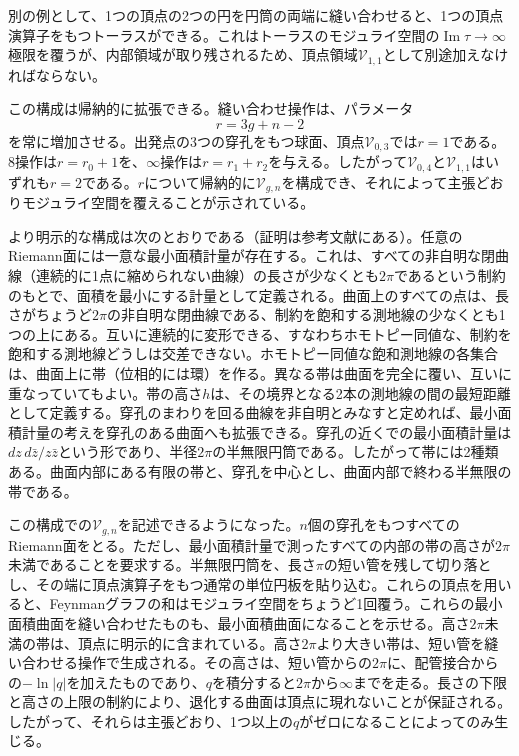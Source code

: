 別の例として、1つの頂点の2つの円を円筒の両端に縫い合わせると、1つの頂点演算子をもつトーラスができる。これはトーラスのモジュライ空間の$\operatorname{Im}\tau\to\infty$極限を覆うが、内部領域が取り残されるため、頂点領域$\mathcal V_{1,1}$として別途加えなければならない。

この構成は帰納的に拡張できる。縫い合わせ操作は、パラメータ
\begin{equation}
 r=3g+n-2
 \tag{9.3.8}\label{eq:9.3.8}
\end{equation}
を常に増加させる。出発点の3つの穿孔をもつ球面、頂点$\mathcal V_{0,3}$では$r=1$である。$8$操作は$r=r_0+1$を、$\infty$操作は$r=r_1+r_2$を与える。したがって$\mathcal V_{0,4}$と$\mathcal V_{1,1}$はいずれも$r=2$である。$r$について帰納的に$\mathcal V_{g,n}$を構成でき、それによって主張どおりモジュライ空間を覆えることが示されている。

より明示的な構成は次のとおりである（証明は参考文献にある）。任意のRiemann面には一意な最小面積計量が存在する。これは、すべての非自明な閉曲線（連続的に1点に縮められない曲線）の長さが少なくとも$2\pi$であるという制約のもとで、面積を最小にする計量として定義される。曲面上のすべての点は、長さがちょうど$2\pi$の非自明な閉曲線である、制約を飽和する測地線の少なくとも1つの上にある。互いに連続的に変形できる、すなわちホモトピー同値な、制約を飽和する測地線どうしは交差できない。ホモトピー同値な飽和測地線の各集合は、曲面上に帯（位相的には環）を作る。異なる帯は曲面を完全に覆い、互いに重なっていてもよい。帯の高さ$h$は、その境界となる2本の測地線の間の最短距離として定義する。穿孔のまわりを回る曲線を非自明とみなすと定めれば、最小面積計量の考えを穿孔のある曲面へも拡張できる。穿孔の近くでの最小面積計量は$dz\,d\bar z/z\bar z$という形であり、半径$2\pi$の半無限円筒である。したがって帯には2種類ある。曲面内部にある有限の帯と、穿孔を中心とし、曲面内部で終わる半無限の帯である。

この構成での$\mathcal V_{g,n}$を記述できるようになった。$n$個の穿孔をもつすべてのRiemann面をとる。ただし、最小面積計量で測ったすべての内部の帯の高さが$2\pi$未満であることを要求する。半無限円筒を、長さ$\pi$の短い管を残して切り落とし、その端に頂点演算子をもつ通常の単位円板を貼り込む。これらの頂点を用いると、Feynmanグラフの和はモジュライ空間をちょうど1回覆う。これらの最小面積曲面を縫い合わせたものも、最小面積曲面になることを示せる。高さ$2\pi$未満の帯は、頂点に明示的に含まれている。高さ$2\pi$より大きい帯は、短い管を縫い合わせる操作で生成される。その高さは、短い管からの$2\pi$に、配管接合からの$-\ln|q|$を加えたものであり、$q$を積分すると$2\pi$から$\infty$までを走る。長さの下限と高さの上限の制約により、退化する曲面は頂点に現れないことが保証される。したがって、それらは主張どおり、1つ以上の$q$がゼロになることによってのみ生じる。

